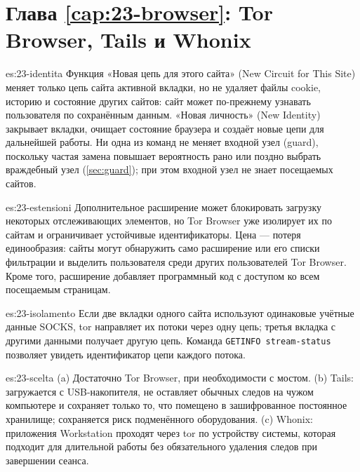 \section*{Глава \ref{cap:23-browser}: Tor Browser, Tails и Whonix}

\begin{soluzione}{es:23-identita}
Функция «Новая цепь для этого сайта» (New Circuit for This Site) меняет только цепь сайта активной вкладки, но не удаляет файлы cookie, историю и состояние других сайтов: сайт может по-прежнему узнавать пользователя по сохранённым данным. «Новая личность» (New Identity) закрывает вкладки, очищает состояние браузера и создаёт новые цепи для дальнейшей работы. Ни одна из команд не меняет входной узел (guard), поскольку частая замена повышает вероятность рано или поздно выбрать враждебный узел (\cref{sec:guard}); при этом входной узел не знает посещаемых сайтов.
\end{soluzione}

\begin{soluzione}{es:23-estensioni}
Дополнительное расширение может блокировать загрузку некоторых отслеживающих элементов, но Tor Browser уже изолирует их по сайтам и ограничивает устойчивые идентификаторы. Цена — потеря единообразия: сайты могут обнаружить само расширение или его списки фильтрации и выделить пользователя среди других пользователей Tor Browser. Кроме того, расширение добавляет программный код с доступом ко всем посещаемым страницам.
\end{soluzione}

\begin{soluzione}{es:23-isolamento}
Если две вкладки одного сайта используют одинаковые учётные данные SOCKS, tor направляет их потоки через одну цепь; третья вкладка с другими данными получает другую цепь. Команда \texttt{GETINFO stream-status} позволяет увидеть идентификатор цепи каждого потока.
\end{soluzione}

\begin{soluzione}{es:23-scelta}
(a) Достаточно Tor Browser, при необходимости с мостом. (b) Tails: загружается с USB-накопителя, не оставляет обычных следов на чужом компьютере и сохраняет только то, что помещено в зашифрованное постоянное хранилище; сохраняется риск подменённого оборудования. (c) Whonix: приложения Workstation проходят через tor по устройству системы, которая подходит для длительной работы без обязательного удаления следов при завершении сеанса.
\end{soluzione}

